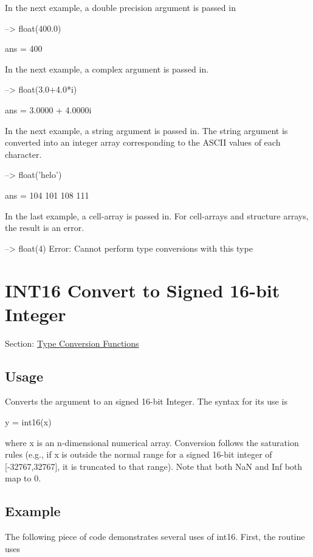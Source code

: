 In the next example, a double precision argument is passed in


\begin{DoxyVerbInclude}
--> float(400.0)

ans = 
 400 
\end{DoxyVerbInclude}


In the next example, a complex argument is passed in.


\begin{DoxyVerbInclude}
--> float(3.0+4.0*i)

ans = 
   3.0000 +  4.0000i 
\end{DoxyVerbInclude}


In the next example, a string argument is passed in. The string argument is converted into an integer array corresponding to the A\-S\-C\-I\-I values of each character.


\begin{DoxyVerbInclude}
--> float('helo')

ans = 
 104 101 108 111 
\end{DoxyVerbInclude}


In the last example, a cell-\/array is passed in. For cell-\/arrays and structure arrays, the result is an error.


\begin{DoxyVerbInclude}
--> float({4})
Error: Cannot perform type conversions with this type
\end{DoxyVerbInclude}
 \hypertarget{typecast_int16}{}\section{I\-N\-T16 Convert to Signed 16-\/bit Integer}\label{typecast_int16}
Section\-: \hyperlink{sec_typecast}{Type Conversion Functions} \hypertarget{vtkwidgets_vtkxyplotwidget_Usage}{}\subsection{Usage}\label{vtkwidgets_vtkxyplotwidget_Usage}
Converts the argument to an signed 16-\/bit Integer. The syntax for its use is \begin{DoxyVerb}   y = int16(x)
\end{DoxyVerb}
 where {\ttfamily x} is an {\ttfamily n}-\/dimensional numerical array. Conversion follows the saturation rules (e.\-g., if {\ttfamily x} is outside the normal range for a signed 16-\/bit integer of {\ttfamily \mbox{[}-\/32767,32767\mbox{]}}, it is truncated to that range). Note that both {\ttfamily Na\-N} and {\ttfamily Inf} both map to 0. \hypertarget{variables_struct_Example}{}\subsection{Example}\label{variables_struct_Example}
The following piece of code demonstrates several uses of {\ttfamily int16}. First, the routine uses


